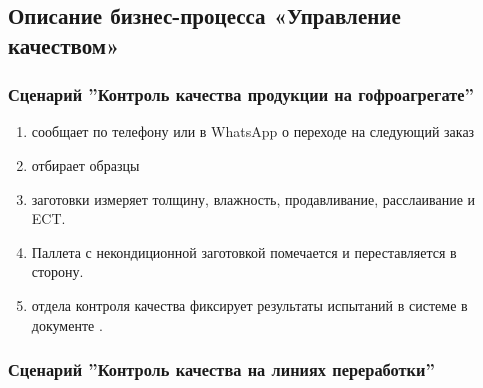 

\subsection{Описание бизнес-процесса «Управление качеством»}
\label{bp:quality}

\subsubsection{Сценарий ''Контроль качества продукции на гофроагрегате''}
\label{bp:quality_1}

\begin{enumerate}



 \item \gaoperator сообщает \laborant по телефону или в WhatsApp о переходе на следующий заказ
 \item \laborant отбирает образцы
 \item \laborant заготовки измеряет толщину, влажность, продавливание, расслаивание и ECT.

\item Паллета  с некондиционной заготовкой помечается и переставляется в сторону.
\item \laborant отдела контроля качества фиксирует результаты испытаний в системе \gofro  в документе .

\end{enumerate}


\subsubsection{Сценарий ''Контроль качества на линиях переработки''}
\label{bp:quality_2}

